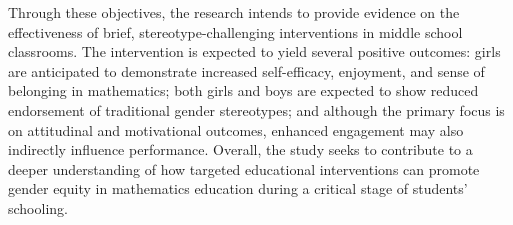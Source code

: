 Through these objectives, the research intends to provide evidence on the effectiveness of brief, stereotype-challenging interventions in middle school classrooms. The intervention is expected to yield several positive outcomes: girls are anticipated to demonstrate increased self-efficacy, enjoyment, and sense of belonging in mathematics; both girls and boys are expected to show reduced endorsement of traditional gender stereotypes; and although the primary focus is on attitudinal and motivational outcomes, enhanced engagement may also indirectly influence performance. Overall, the study seeks to contribute to a deeper understanding of how targeted educational interventions can promote gender equity in mathematics education during a critical stage of students' schooling.